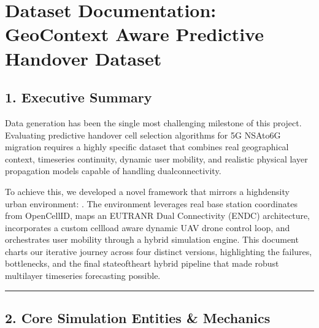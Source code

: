 \documentclass[letterpaper,10pt,english]{sphinxmanual}
\begin{document}
\sphinxstepscope


\chapter{Dataset Documentation: Geo\sphinxhyphen{}Context Aware Predictive Handover Dataset}
\label{\detokenize{dataset:dataset-documentation-geo-context-aware-predictive-handover-dataset}}\label{\detokenize{dataset::doc}}

\section{1. Executive Summary}
\label{\detokenize{dataset:executive-summary}}
\sphinxAtStartPar
Data generation has been the single most challenging milestone of this project. Evaluating predictive handover cell selection algorithms for 5G NSA\sphinxhyphen{}to\sphinxhyphen{}6G migration requires a highly specific dataset that combines real geographical context, time\sphinxhyphen{}series continuity, dynamic user mobility, and realistic physical layer propagation models capable of handling dual\sphinxhyphen{}connectivity.

\sphinxAtStartPar
To achieve this, we developed a novel framework that mirrors a high\sphinxhyphen{}density urban environment: . The environment leverages real base station coordinates from OpenCellID, maps an E\sphinxhyphen{}UTRA\sphinxhyphen{}NR Dual Connectivity (EN\sphinxhyphen{}DC) architecture, incorporates a custom cell\sphinxhyphen{}load aware dynamic UAV drone control loop, and orchestrates user mobility through a hybrid simulation engine. This document charts our iterative journey across four distinct versions, highlighting the failures, bottlenecks, and the final state\sphinxhyphen{}of\sphinxhyphen{}the\sphinxhyphen{}art hybrid pipeline that made robust multi\sphinxhyphen{}layer time\sphinxhyphen{}series forecasting possible.


\bigskip\hrule\bigskip



\section{2. Core Simulation Entities \& Mechanics}
\label{\detokenize{dataset:core-simulation-entities-mechanics}}
\end{document}
